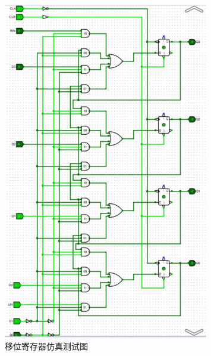 \documentclass{article}
\begin{document}
    \begin{figure}[H]
    \centering






    \includegraphics[width=0.8\textwidth]{3.5.3.png}
    \caption{移位寄存器仿真测试图}
    \end{figure}
\end{document}
